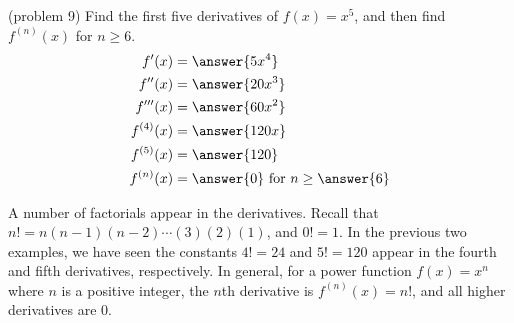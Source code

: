 \documentclass[handout]{ximera}
\begin{document}
\begin{problem}(problem 9)
Find the first five derivatives of $f(x) = x^5$, and then find $f^{(n)}(x)$ for $n \geq 6$.
\begin{align}
f'(x) &= \answer{5x^4}\\
f''(x) &= \answer{20x^3}\\
f'''(x) &= \answer{60x^2}\\
f^{(4)}(x) &= \answer{120x}\\
f^{(5)}(x) &= \answer{120}\\
f^{(n)}(x) &= \answer{0} \text{ for } n \geq \answer{6}
\end{align}

A number of factorials appear in the derivatives. Recall that $n! = n(n-1)(n-2)\cdots(3)(2)(1)$, and $0! = 1$.
In the previous two examples, we have seen the constants $4! = 24$ and $5! = 120$ appear in the fourth and fifth derivatives, respectively. 
In general, for a power function $f(x) = x^n$ where $n$ is a positive integer, the $n$th derivative is $f^{(n)}(x) = n!$, and all higher derivatives are 0. 
\end{problem}
\end{document}
